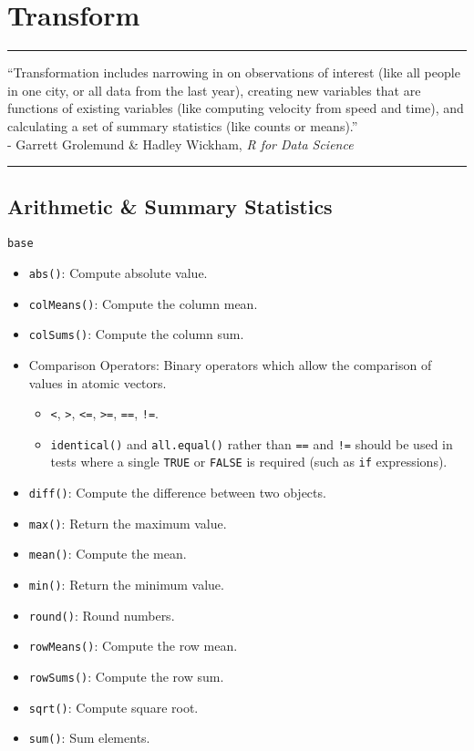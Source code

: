 \documentclass[]{book}
\providecommand{\tightlist}{%
  \setlength{\itemsep}{0pt}\setlength{\parskip}{0pt}}
\theoremstyle{definition}
\theoremstyle{definition}
\theoremstyle{definition}
\theoremstyle{remark}
\begin{document}
\chapter{Transform}\label{transform}

\begin{center}\rule{0.5\linewidth}{\linethickness}\end{center}

``Transformation includes narrowing in on observations of interest (like
all people in one city, or all data from the last year), creating new
variables that are functions of existing variables (like computing
velocity from speed and time), and calculating a set of summary
statistics (like counts or means).''\\
- Garrett Grolemund \& Hadley Wickham, \emph{R for Data Science}

\begin{center}\rule{0.5\linewidth}{\linethickness}\end{center}

\section{Arithmetic \& Summary
Statistics}\label{arithmetic-summary-statistics}

\texttt{base}

\begin{itemize}
\tightlist
\item
  \texttt{abs()}: Compute absolute value.
\item
  \texttt{colMeans()}: Compute the column mean.
\item
  \texttt{colSums()}: Compute the column sum.
\item
  Comparison Operators: Binary operators which allow the comparison of
  values in atomic vectors.

  \begin{itemize}
  \tightlist
  \item
    \texttt{\textless{}}, \texttt{\textgreater{}},
    \texttt{\textless{}=}, \texttt{\textgreater{}=}, \texttt{==},
    \texttt{!=}.
  \item
    \texttt{identical()} and \texttt{all.equal()} rather than
    \texttt{==} and \texttt{!=} should be used in tests where a single
    \texttt{TRUE} or \texttt{FALSE} is required (such as \texttt{if}
    expressions).
  \end{itemize}
\item
  \texttt{diff()}: Compute the difference between two objects.
\item
  \texttt{max()}: Return the maximum value.
\item
  \texttt{mean()}: Compute the mean.
\item
  \texttt{min()}: Return the minimum value.
\item
  \texttt{round()}: Round numbers.
\item
  \texttt{rowMeans()}: Compute the row mean.
\item
  \texttt{rowSums()}: Compute the row sum.
\item
  \texttt{sqrt()}: Compute square root.
\item
  \texttt{sum()}: Sum elements.
\end{itemize}
\end{document}
